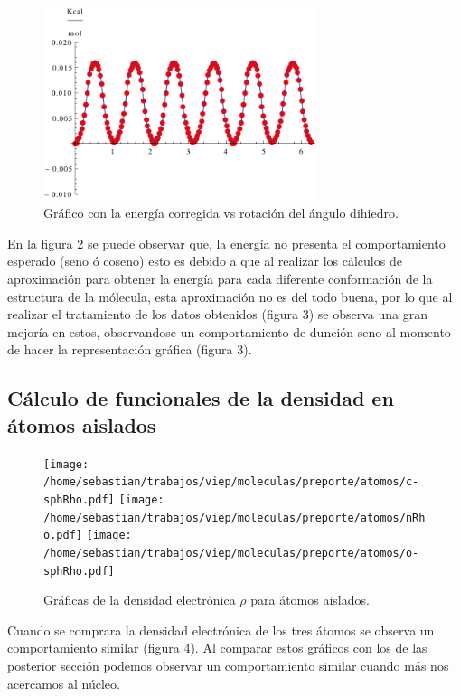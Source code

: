 \documentclass[12pt,letterpaper]{article}
\begin{document}
\begin{figure}[H]
 \begin{center}
 \includegraphics[width=8cm]{12345.pdf}
 \caption{Gráfico con la energía corregida vs rotación del ángulo dihiedro.}
\end{center}
\end{figure}

En la figura 2 se puede observar que, la energía no presenta el comportamiento esperado (seno ó coseno) esto es debido a que al realizar los cálculos de aproximación para obtener la energía para cada diferente conformación de la estructura de la mólecula, esta aproximación no es del todo buena, por lo que al realizar el tratamiento de los datos obtenidos (figura 3) se observa una gran mejoría en estos, observandose un comportamiento de dunción seno al momento de hacer la representación gráfica (figura 3). 
\subsection{Cálculo de funcionales de la densidad en átomos aislados}

\begin{figure}[H]
 \begin{center}
  \texttt{[image: /home/sebastian/trabajos/viep/moleculas/preporte/atomos/c-sphRho.pdf]}
\texttt{[image: /home/sebastian/trabajos/viep/moleculas/preporte/atomos/nRho.pdf]}
\texttt{[image: /home/sebastian/trabajos/viep/moleculas/preporte/atomos/o-sphRho.pdf]}
 \end{center}
\caption{Gráficas de la densidad electrónica $\rho$ para átomos aislados.}
\end{figure}

Cuando se comprara la densidad electrónica de los tres átomos se observa un comportamiento similar (figura 4). Al comparar estos gráficos con los de las posterior sección podemos observar un comportamiento similar cuando más nos acercamos al  núcleo.
\end{document}
